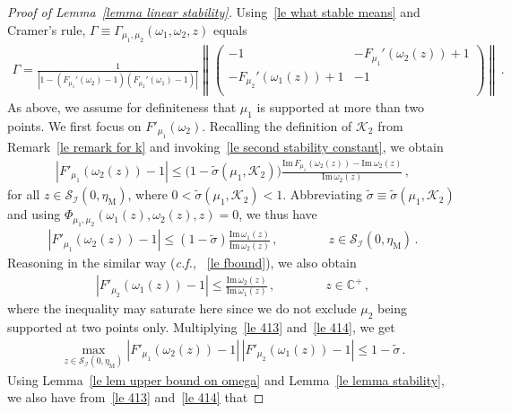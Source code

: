 \documentclass[10pt,reqno]{amsart}
\numberwithin{equation}{section}
\theoremstyle{plain}
\numberwithin{kevin}{section}
\theoremstyle{remark}
\newcommand{\im}{\mathrm{Im}\,}
\newcommand{\C}{{\mathbb C}}
\newcommand{\cf}{\emph{c.f., }}
\newcommand{\PP}{\Phi}
\begin{document}
\begin{proof}[Proof of Lemma~\ref{lemma linear stability}]
 Using~\eqref{le what stable means} and  Cramer's rule, $\Gamma\equiv\Gamma_{\mu_1,\mu_2}(\omega_1,\omega_2,z) $ equals\small
\begin{align}\label{le gamma for the second}
 \Gamma=\frac{1}{\left|1-(F_{\mu_1}'(\omega_2)-1) (F_{\mu_2}'(\omega_1)-1) \right|}\left\|\left( \begin{array}{cc}
 -1& -F_{\mu_1}'(\omega_2(z))+1  \\
 -F_{\mu_2}'(\omega_1(z))+1 & -1\\
   \end{array} \right) \right\|\,.
\end{align}\normalsize
As above, we assume for definiteness that $\mu_1$ is supported at more than two points. We first focus on $F'_{\mu_1}(\omega_2)$. Recalling the definition of $\mathcal{K}_2$ from Remark~\ref{le remark for k} and invoking~\eqref{le second stability constant}, we obtain
\begin{align}
 |F'_{\mu_1}(\omega_2(z))-1| \le \big( 1-\widetilde\sigma(\mu_1,\mathcal{K}_2)\big) \frac{\im F_{\mu_1}(\omega_2(z))-\im\omega_2(z)}{\im \omega_2(z)} \,,
\end{align}
for all $z\in\mathcal{S}_{\mathcal{I}}(0,\eta_{\mathrm{M}})$, where $0<\widetilde\sigma(\mu_1,\mathcal{K}_2)<1$. Abbreviating $\widetilde\sigma\equiv\widetilde\sigma(\mu_1,\mathcal{K}_2)$ and using $\PP_{\mu_1,\mu_2}(\omega_1(z),\omega_2(z),z)=0$, we thus have
\begin{align}\label{le 413}
  |F'_{\mu_1}(\omega_2(z))-1| \le \left(1-\widetilde\sigma\right)\frac{\im \omega_1(z)}{\im \omega_2(z)}\,,\qquad\qquad z\in \mathcal{S}_{\mathcal{I}}(0,\eta_{\mathrm{M}})\,.
\end{align}
Reasoning in the similar way (\cf~\eqref{le fbound}), we also obtain
\begin{align}\label{le 414}
 |F'_{\mu_2}(\omega_1(z))-1|\le \frac{\im \omega_2(z)}{\im \omega_1(z)}\,,\qquad \qquad z\in\C^+\,,
\end{align}
where the inequality may saturate here since we do not exclude $\mu_2$ being supported at two points only. Multiplying~\eqref{le 413} and~\eqref{le 414}, we get
\begin{align}\label{le bound on determinant}
 \max_{z\in\mathcal{S}_{\mathcal{I}}(0,\eta_{\mathrm{M}})}|F'_{\mu_1}(\omega_2(z))-1|\, |F'_{\mu_2}(\omega_1(z))-1|\le  1-\widetilde\sigma\,.
\end{align}
Using Lemma~\ref{le lem upper bound on omega} and Lemma~\ref{le lemma stability}, we also have from~\eqref{le 413} and~\eqref{le 414} that

\end{proof}
\end{document}

